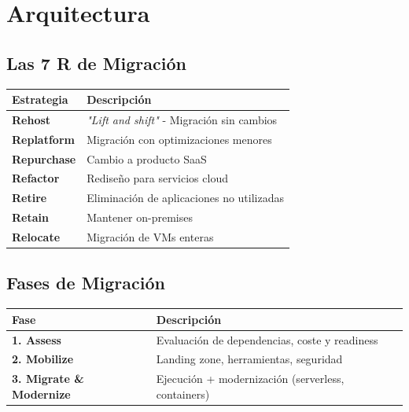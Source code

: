 \documentclass[12pt,a4paper]{report}
\begin{document}
\newpage

\chapter{Arquitectura}

\section{Las 7 R de Migración}

\begin{center}
\begin{longtable}{|p{3cm}|p{9cm}|}
\hline
\cellcolor{awsblue!20}\textbf{Estrategia} & \cellcolor{awsblue!20}\textbf{Descripción} \\
\hline
\textbf{Rehost} & \textit{"Lift and shift"} - Migración sin cambios \\
\hline
\textbf{Replatform} & Migración con optimizaciones menores \\
\hline
\textbf{Repurchase} & Cambio a producto SaaS \\
\hline
\cellcolor{successgreen!20}\textbf{Refactor} & Rediseño para servicios cloud \\
\hline
\textbf{Retire} & Eliminación de aplicaciones no utilizadas \\
\hline
\textbf{Retain} & Mantener on-premises \\
\hline
\textbf{Relocate} & Migración de VMs enteras \\
\hline
\end{longtable}
\end{center}

\section{Fases de Migración}

\begin{center}
\begin{longtable}{|p{3cm}|p{9cm}|}
\hline
\cellcolor{awsblue!20}\textbf{Fase} & \cellcolor{awsblue!20}\textbf{Descripción} \\
\hline
\textbf{1. Assess} & Evaluación de dependencias, coste y readiness \\
\hline
\textbf{2. Mobilize} & Landing zone, herramientas, seguridad \\
\hline
\textbf{3. Migrate \& Modernize} & Ejecución + modernización (serverless, containers) \\
\hline
\end{longtable}
\end{center}
\end{document}
